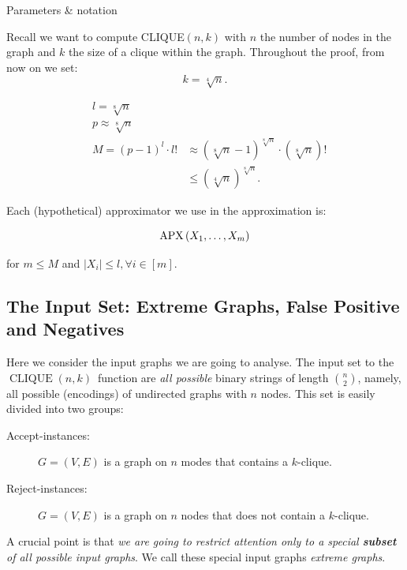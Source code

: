 \begin{trailer}{Parameters \& notation}

Recall we want to compute CLIQUE$(n, k)$
with $n$ the number of nodes in the graph and $k$ the size of a clique within the graph. 
Throughout the proof, from now on we set:
$$
k=\sqrt[4]{n}.
$$


$$
\begin{aligned}
& l=\sqrt[8]{n} \\
& p \approx \sqrt[8]{n} \\
& M=(p-1)^l \cdot l! & \approx(\sqrt[8]{n}-1)^{\sqrt[8]{n}} \cdot(\sqrt[8]{n})! \\
& & \leq(\sqrt[4]{n})^{\sqrt[8]{n}}.
\end{aligned}
$$


Each (hypothetical) approximator we use in the approximation is:

$$
\mathrm{APX}\left(X_1, \ldots, X_m\right)
$$

for $m \leq M$ and $\left|X_i\right| \leq l, \forall i \in[m]$.
\end{trailer}

\newcommand{\cliquenk}{\ensuremath{\operatorname{CLIQUE}(n,k)}}

\subsection{The Input Set: Extreme Graphs, False Positive and  Negatives}

Here we consider the input graphs we are going to analyse. 
The input set to the \cliquenk\ function are \emph{all possible} binary strings of length $n\choose 2$, namely, all possible (encodings) of undirected graphs with $n$ nodes. This set is easily divided into two groups:

\begin{description}
\item[Accept-instances:] 
$G=(V, E)$ is a graph on $n$ modes that contains a $k$-clique.
\item[Reject-instances:]
$G=(V, E)$ is a graph on $n$ nodes that does not contain a $k$-clique.
\end{description}


 



A crucial point is that \emph{we are going to restrict attention only to a special \textbf{subset} of all possible input graphs}. We call these special input graphs \emph{extreme graphs}. 

